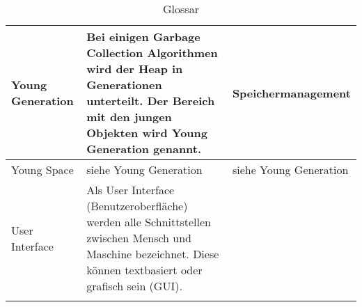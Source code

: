 \begin{longtable}{|p{4.5cm}|p{6cm}|p{4.1cm}|}
  Young Generation &  Bei einigen Garbage Collection Algorithmen wird der Heap in Generationen unterteilt. Der Bereich mit den jungen Objekten wird Young Generation genannt.  & Speichermanagement \\\hline
  Young Space &  siehe Young Generation & siehe Young Generation \\\hline
User Interface &  Als User Interface (Benutzeroberfläche) werden alle Schnittstellen zwischen Mensch und Maschine bezeichnet. Diese können textbasiert oder grafisch sein (GUI). &  \\\hline
      \caption{Glossar}\\
  \end{longtable}



